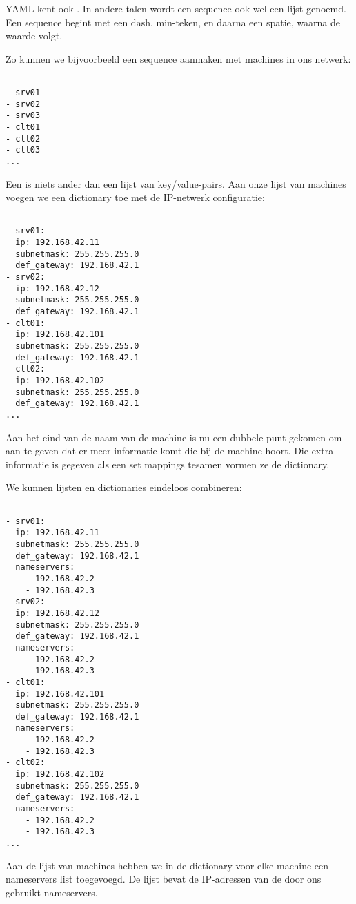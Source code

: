 YAML kent ook . In andere talen wordt een sequence ook wel een lijst genoemd. Een sequence begint met een dash, min-teken, en daarna een spatie, waarna de waarde volgt.

Zo kunnen we bijvoorbeeld een sequence aanmaken met machines in ons netwerk:
\begin{verbatim}
---
- srv01
- srv02
- srv03
- clt01
- clt02
- clt03
...
\end{verbatim}


Een  is niets ander dan een lijst van key/value-pairs. Aan onze lijst van machines voegen we een dictionary toe met de IP-netwerk configuratie:
\begin{verbatim}
---
- srv01:
  ip: 192.168.42.11
  subnetmask: 255.255.255.0
  def_gateway: 192.168.42.1
- srv02:
  ip: 192.168.42.12
  subnetmask: 255.255.255.0
  def_gateway: 192.168.42.1
- clt01:
  ip: 192.168.42.101
  subnetmask: 255.255.255.0
  def_gateway: 192.168.42.1
- clt02:
  ip: 192.168.42.102
  subnetmask: 255.255.255.0
  def_gateway: 192.168.42.1
...
\end{verbatim}
Aan het eind van de naam van de machine is nu een dubbele punt gekomen om aan te geven dat er meer informatie komt die bij de machine hoort. Die extra informatie is gegeven als een set mappings tesamen vormen ze de dictionary.

We kunnen lijsten en dictionaries eindeloos combineren:
\begin{verbatim}
---
- srv01:
  ip: 192.168.42.11
  subnetmask: 255.255.255.0
  def_gateway: 192.168.42.1
  nameservers:
    - 192.168.42.2
    - 192.168.42.3
- srv02:
  ip: 192.168.42.12
  subnetmask: 255.255.255.0
  def_gateway: 192.168.42.1
  nameservers:
    - 192.168.42.2
    - 192.168.42.3
- clt01:
  ip: 192.168.42.101
  subnetmask: 255.255.255.0
  def_gateway: 192.168.42.1
  nameservers:
    - 192.168.42.2
    - 192.168.42.3
- clt02:
  ip: 192.168.42.102
  subnetmask: 255.255.255.0
  def_gateway: 192.168.42.1
  nameservers:
    - 192.168.42.2
    - 192.168.42.3
...
\end{verbatim}
Aan de lijst van machines hebben we in de dictionary voor elke machine een nameservers list toegevoegd. De lijst bevat de IP-adressen van de door ons gebruikt nameservers.

